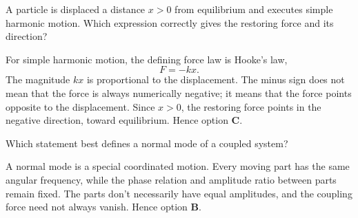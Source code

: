 %

\begin{quizquestion}[
  id=phy104-osc-001,
  topic=oscillations,
  difficulty=foundation,
  marks=1,
  correct=C,
  tags={shm,restoring-force,hookes-law},
  outcome={Identify the magnitude and direction of a restoring force}
]
  A particle is displaced a distance \(x>0\) from equilibrium and executes simple harmonic motion. Which expression correctly gives the restoring force and its direction?
\end{quizquestion}
\begin{quizsolution}
  For simple harmonic motion, the defining force law is Hooke's law,
  \[
    F=-kx.
  \]
  The magnitude \(kx\) is proportional to the displacement. The minus sign does not mean that the force is always numerically negative; it means that the force points opposite to the displacement. Since \(x>0\), the restoring force points in the negative direction, toward equilibrium. Hence option \textbf{C}.
\end{quizsolution}

\begin{quizquestion}[
  id=phy104-nm-006,
  topic=normal-modes,
  difficulty=foundation,
  marks=1,
  correct=B,
  tags={normal-mode,coupled-system,phase-relation},
  outcome={Recognise the defining features of a normal mode}
]
  Which statement best defines a normal mode of a coupled system?
\end{quizquestion}
\begin{quizsolution}
  A normal mode is a special coordinated motion. Every moving part has the same angular frequency, while the phase relation and amplitude ratio between parts remain fixed. The parts don't necessarily have equal amplitudes, and the coupling force need not always vanish. Hence option \textbf{B}.
\end{quizsolution}

